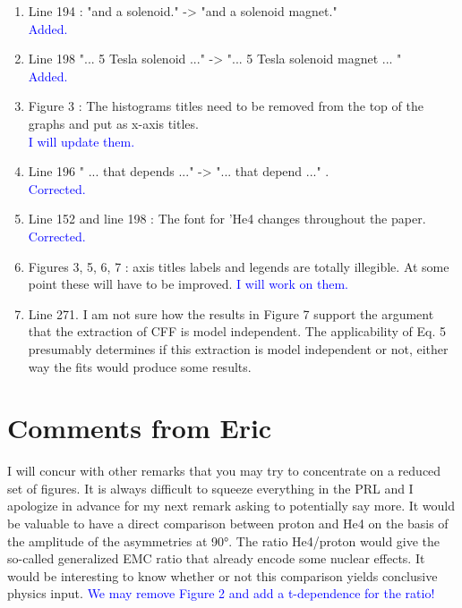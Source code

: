 \documentclass[a4paper,11pt,twoside]{article}
\begin{document}
\begin{enumerate}
\item Line 194 : "and a solenoid." -> "and a solenoid magnet."\\
\textcolor{blue}{Added. }
  
\item Line 198 "... 5 Tesla solenoid ..." -> "... 5 Tesla solenoid magnet
... "\\
\textcolor{blue}{Added. }
  
\item Figure 3 : The histograms titles need to be removed from the top of
the graphs and put as x-axis titles.\\
\textcolor{blue}{I will update them.}
  
\item Line 196 " ... that depends ..." -> "... that depend ..." .\\
\textcolor{blue}{Corrected. }
  
\item Line 152 and line 198 : The font for 'He4 changes throughout the paper.\\
\textcolor{blue}{Corrected.}
  
\item Figures 3, 5, 6, 7 : axis titles labels and legends are totally
illegible. At some point these will have to be improved.
\textcolor{blue}{I will work on them.}
  
\item Line 271. I am not sure how the results in Figure 7 support the
argument that the extraction of CFF is
model independent. The applicability of Eq. 5 presumably determines if
this extraction is model independent or not,
either way the fits would produce some results.
\textcolor{blue}{ }
  
\end{enumerate}





\section{Comments from Eric}
I will concur with other remarks that you may try to concentrate on a reduced 
set of figures. It is always difficult to squeeze everything in the PRL and I 
apologize in advance for my next remark asking to potentially say more. It 
would be valuable to have a direct comparison between proton and He4 on the 
basis of the amplitude of the asymmetries at 90°. The ratio He4/proton would 
give the so-called generalized EMC ratio that already encode some nuclear 
effects. It would be interesting to know whether or not this comparison yields 
conclusive physics input.
\textcolor{blue}{We may remove Figure 2 and add a t-dependence for the ratio! }
  
\end{document}
